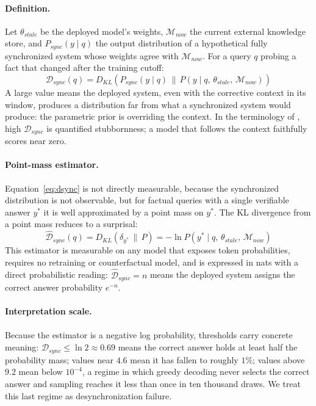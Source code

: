 \documentclass[10pt]{article}
\begin{document}
\paragraph{Definition.} Let $\theta_{stale}$ be the deployed model's weights, $\mathcal{M}_{now}$ the current external knowledge store, and $P_{sync}(y \mid q)$ the output distribution of a hypothetical fully synchronized system whose weights agree with $\mathcal{M}_{now}$. For a query $q$ probing a fact that changed after the training cutoff:
\begin{equation}
  \label{eq:dsync}
  \mathcal{D}_{sync}(q) = D_{KL}\!\left( P_{sync}(y \mid q) \,\Big\|\, P(y \mid q,\, \theta_{stale},\, \mathcal{M}_{now}) \right)
\end{equation}
A large value means the deployed system, even with the corrective context in its window, produces a distribution far from what a synchronized system would produce: the parametric prior is overriding the context. In the terminology of \citet{xie2024conflicts}, high $\mathcal{D}_{sync}$ is quantified stubbornness; a model that follows the context faithfully scores near zero.

\paragraph{Point-mass estimator.} Equation~\ref{eq:dsync} is not directly measurable, because the synchronized distribution is not observable, but for factual queries with a single verifiable answer $y^*$ it is well approximated by a point mass on $y^*$. The KL divergence from a point mass reduces to a surprisal:
\begin{equation}
  \label{eq:estimator}
  \widehat{\mathcal{D}}_{sync}(q) = D_{KL}\!\left( \delta_{y^*} \,\|\, P \right) = -\ln P\!\left(y^* \mid q,\, \theta_{stale},\, \mathcal{M}_{now}\right)
\end{equation}
This estimator is measurable on any model that exposes token probabilities, requires no retraining or counterfactual model, and is expressed in nats with a direct probabilistic reading: $\widehat{\mathcal{D}}_{sync} = n$ means the deployed system assigns the correct answer probability $e^{-n}$.

\paragraph{Interpretation scale.} Because the estimator is a negative log probability, thresholds carry concrete meaning: $\widehat{\mathcal{D}}_{sync} \leq \ln 2 \approx 0.69$ means the correct answer holds at least half the probability mass; values near $4.6$ mean it has fallen to roughly $1\%$; values above $9.2$ mean below $10^{-4}$, a regime in which greedy decoding never selects the correct answer and sampling reaches it less than once in ten thousand draws. We treat this last regime as desynchronization failure.
\end{document}
